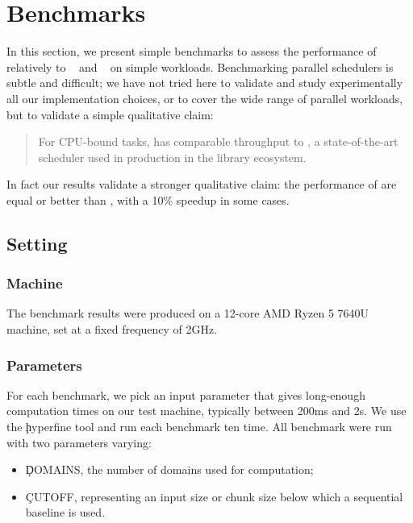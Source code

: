 \section{Benchmarks}
\label{app:benchmarks}

In this section, we present simple benchmarks to assess the performance of \Parabs relatively to \Domainslib~\citep{domainslib} and \Moonpool~\citep{moonpool} on simple workloads.
Benchmarking parallel schedulers is subtle and difficult; we have not tried here to validate and study experimentally all our implementation choices, or to cover the wide range of parallel workloads, but to validate a simple qualitative claim:

\begin{quotation}
  For CPU-bound tasks, \Parabs has comparable throughput to \Domainslib, a state-of-the-art scheduler used in production in the \OCamlFive library ecosystem.
\end{quotation}

In fact our results validate a stronger qualitative claim: the performance of \Parabs are equal or better than \Domainslib, with a 10\% speedup in some cases.

\subsection{Setting}

\subsubsection{Machine}

The benchmark results were produced on a 12-core AMD Ryzen 5 7640U machine, set at a fixed frequency of 2GHz.

\subsubsection{Parameters}

For each benchmark, we pick an input parameter that gives long-enough computation times on our test machine, typically between 200ms and 2s.
We use the \c{hyperfine} tool and run each benchmark ten time.
All benchmark were run with two parameters varying:
\begin{itemize}
  \item
    \c{DOMAINS}, the number of domains  used for computation;
  \item
    \c{CUTOFF}, representing an input size or chunk size below which a sequential baseline is used.
\end{itemize}

